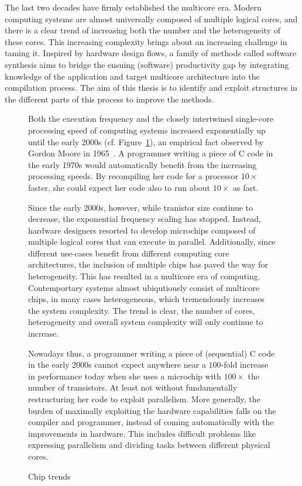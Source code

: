 The last two decades have firmly established the multicore era. Modern computing systems are almost universally composed of multiple logical cores, and there is a clear trend of increasing both the number and the heterogeneity of these cores. This increasing complexity brings about an increasing challenge in taming it. Inspired by hardware design flows, a family of methods called software synthesis aims to bridge the ensuing (software) productivity gap by integrating knowledge of the application and target multicore architecture into the compilation process. The aim of this thesis is to identify and exploit structures in the different parts of this process to improve the methods.

\begin{figure}[h]
	\centering
   \resizebox{0.85\textwidth}{!}{}
	\caption{Chip trends}
	\label{fig:multicore_era}


Both the execution frequency and the closely intertwined single-core processing speed of computing systems increased exponentially up until the early 2000s (cf. Figure~\ref{fig:multicore_era}), an empirical fact observed by Gordon Moore in 1965~\cite{moore}. A programmer writing a piece of C code in the early 1970s would automatically benefit from the increasing processing speeds. By recompiling her code for a processor $10 \times$ faster, she could expect her code also to run about $10 \times$ as fast.%

Since the early 2000s, however, while tranistor size continue to decrease, the exponential frequency scaling has stopped. Instead, hardware designers resorted to develop microchips composed of multiple logical cores that can execute in parallel. Additionally, since different use-cases benefit from different computing core architectures, the inclusion of multiple chips has paved the way for heterogeneity. This has resulted in a multicore era of computing. Contemportary systems almost ubiqutiously consist of multicore chips, in many cases heterogeneous, which tremendously increases the system complexity. The trend is clear, the number of cores, heterogeneity and overall system complexity will only continue to increase.

Nowadays thus, a programmer writing a piece of (sequential) C code in the early 2000s cannot expect anywhere near a $100$-fold increase in performance today when she uses a microchip with $100 \times$ the number of transistors.
At least not without fundamentally restructuring her code to exploit parallelism.
More generally, the burden of maximally exploiting the hardware capabilities falls on the compiler and programmer, instead of coming automatically with the improvements in hardware.
This includes difficult problems like expressing parallelism and dividing tasks between different physical cores. %


\end{figure}

